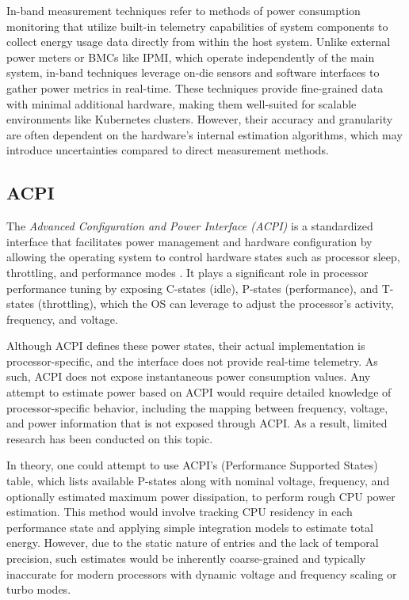 In-band measurement techniques refer to methods of power consumption monitoring that utilize built-in telemetry capabilities of system components to collect energy usage data directly from within the host system. Unlike external power meters or BMCs like IPMI, which operate independently of the main system, in-band techniques leverage on-die sensors and software interfaces to gather power metrics in real-time. These techniques provide fine-grained data with minimal additional hardware, making them well-suited for scalable environments like Kubernetes clusters. However, their accuracy and granularity are often dependent on the hardware's internal estimation algorithms, which may introduce uncertainties compared to direct measurement methods.

\subsection{ACPI}

The \textit{Advanced Configuration and Power Interface (ACPI)} is a standardized interface that facilitates power management and hardware configuration by allowing the operating system to control hardware states such as processor sleep, throttling, and performance modes \cite{uefi_acpi_6_6}. It plays a significant role in processor performance tuning by exposing C-states (idle), P-states (performance), and T-states (throttling), which the OS can leverage to adjust the processor's activity, frequency, and voltage.

Although ACPI defines these power states, their actual implementation is processor-specific, and the interface does not provide real-time telemetry. As such, ACPI does not expose instantaneous power consumption values. Any attempt to estimate power based on ACPI would require detailed knowledge of processor-specific behavior, including the mapping between frequency, voltage, and power information that is not exposed through ACPI. As a result, limited research has been conducted on this topic.

In theory, one could attempt to use ACPI's  (Performance Supported States) table, which lists available P-states along with nominal voltage, frequency, and optionally estimated maximum power dissipation, to perform rough CPU power estimation. This method would involve tracking CPU residency in each performance state and applying simple integration models to estimate total energy. However, due to the static nature of  entries and the lack of temporal precision, such estimates would be inherently coarse-grained and typically inaccurate for modern processors with dynamic voltage and frequency scaling or turbo modes.


